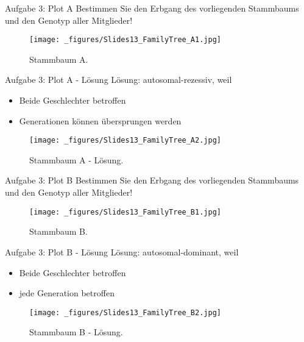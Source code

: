 \documentclass{beamer}
\begin{document}
\begin{frame}{Aufgabe 3: Plot A}
Bestimmen Sie den Erbgang des vorliegenden Stammbaums und den Genotyp aller Mitglieder!

\begin{figure}[h]
\begin{center}
\texttt{[image: \_figures/Slides13\_FamilyTree\_A1.jpg]}
\caption{Stammbaum A.}
\label{fig:tree_A1}
\end{center}
\end{figure}    
\end{frame}

\begin{frame}{Aufgabe 3: Plot A - Lösung}
Lösung: autosomal-rezessiv, weil

\begin{itemize}
    \item Beide Geschlechter betroffen
    \item Generationen können übersprungen werden  
\end{itemize}

\begin{figure}[h]
\begin{center}
\texttt{[image: \_figures/Slides13\_FamilyTree\_A2.jpg]}
\caption{Stammbaum A - Lösung.}
\label{fig:tree_A2}
\end{center}
\end{figure}    
\end{frame}

\begin{frame}{Aufgabe 3: Plot B}
Bestimmen Sie den Erbgang des vorliegenden Stammbaums und den Genotyp aller Mitglieder!

\begin{figure}[h]
\begin{center}
\texttt{[image: \_figures/Slides13\_FamilyTree\_B1.jpg]}
\caption{Stammbaum B.}
\label{fig:tree_B1}
\end{center}
\end{figure}    
\end{frame}

\begin{frame}{Aufgabe 3: Plot B - Lösung}
Lösung: autosomal-dominant, weil

\begin{itemize}
    \item Beide Geschlechter betroffen
    \item jede Generation betroffen  
\end{itemize}

\begin{figure}[h]
\begin{center}
\texttt{[image: \_figures/Slides13\_FamilyTree\_B2.jpg]}
\caption{Stammbaum B - Lösung.}
\label{fig:tree_B2}
\end{center}
\end{figure}    
\end{frame}
\end{document}
